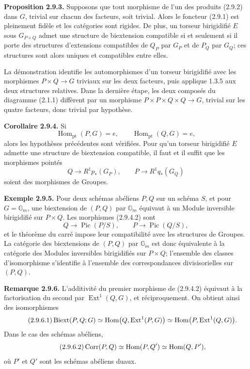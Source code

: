 \documentclass[11pt]{article}
\providecommand{\Pic}{\operatorname{Pic}}
\providecommand{\Ext}{\operatorname{Ext}}
\begin{document}
\textbf{Proposition 2.9.3.}  Supposons que tout morphisme de l'un des produits (2.9.2) dans \(G\), trivial sur chacun des facteurs, soit trivial.  Alors le foncteur (2.9.1) est pleinement fidèle et les catégories sont rigides.  De plus, un torseur birigidifié \(E\) sous \(G_{P\times Q}\) admet une structure de biextension compatible si et seulement si il porte des structures d'extensions compatibles de \(Q_P\) par \(G_P\) et de \(P_Q\) par \(G_Q\); ces structures sont alors uniques et compatibles entre elles.

La démonstration identifie les automorphismes d'un torseur birigidifié avec les morphismes \(P\times Q\to G\) triviaux sur les deux facteurs, puis applique 1.3.5 aux deux structures relatives.  Dans la dernière étape, les deux composés du diagramme (2.1.1) diffèrent par un morphisme \(P\times P\times Q\times Q\to G\), trivial sur les quatre facteurs, donc trivial par hypothèse.

\textbf{Corollaire 2.9.4.}  Si
\begin{equation}\tag{2.9.4.1}
  \operatorname{Hom}_{\mathrm{pt}}(P,G)=e,
  \qquad
  \operatorname{Hom}_{\mathrm{pt}}(Q,G)=e,
\end{equation}
alors les hypothèses précédentes sont vérifiées.  Pour qu'un torseur birigidifié \(E\) admette une structure de biextension compatible, il faut et il suffit que les morphismes pointés
\begin{equation}\tag{2.9.4.2}
  Q\longrightarrow R^1p_*(G_P),
  \qquad
  P\longrightarrow R^1q_*(G_Q)
\end{equation}
soient des morphismes de Groupes.

\textbf{Exemple 2.9.5.}  Pour deux schémas abéliens \(P,Q\) sur un schéma \(S\), et pour \(G=\mathbb G_m\), une biextension de \((P,Q)\) par \(\mathbb G_m\) équivaut à un Module inversible birigidifié sur \(P\times Q\).  Les morphismes (2.9.4.2) sont
\begin{equation}\tag{2.9.5.1}
  Q\longrightarrow \Pic(P/S),
  \qquad
  P\longrightarrow \Pic(Q/S),
\end{equation}
et le théorème du carré impose leur compatibilité avec les structures de Groupes.  La catégorie des biextensions de \((P,Q)\) par \(\mathbb G_m\) est donc équivalente à la catégorie des Modules inversibles birigidifiés sur \(P\times Q\); l'ensemble des classes d'isomorphisme s'identifie à l'ensemble des correspondances divisisorielles sur \((P,Q)\).

\textbf{Remarque 2.9.6.}  L'additivité du premier morphisme de (2.9.4.2) équivaut à la factorisation du second par \(\Ext^1(Q,G)\), et réciproquement.  On obtient ainsi des isomorphismes
\begin{equation}\tag{2.9.6.1}
  \Biext(P,Q;G)
  \simeq\operatorname{Hom}\bigl(Q,\Ext^1(P,G)\bigr)
  \simeq\operatorname{Hom}\bigl(P,\Ext^1(Q,G)\bigr).
\end{equation}
Dans le cas des schémas abéliens,
\begin{equation}\tag{2.9.6.2}
  \operatorname{Corr}(P,Q)\simeq\operatorname{Hom}(P,Q')\simeq\operatorname{Hom}(Q,P'),
\end{equation}
où \(P'\) et \(Q'\) sont les schémas abéliens duaux.
\end{document}
